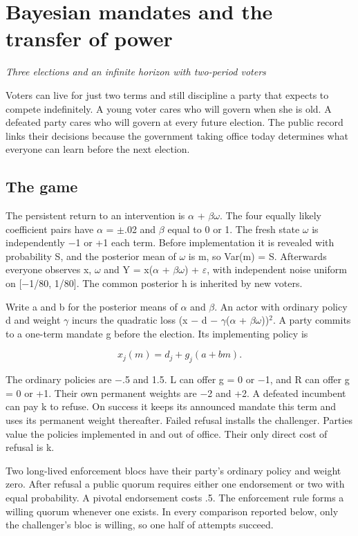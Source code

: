 \documentclass[11pt]{article}
\begin{document}
\section*{Bayesian mandates and the transfer of power}
\emph{Three elections and an infinite horizon with two-period voters}

Voters can live for just two terms and still discipline a party that expects to compete indefinitely. A young voter cares who will govern when she is old. A defeated party cares who will govern at every future election. The public record links their decisions because the government taking office today determines what everyone can learn before the next election.

\subsection*{The game}

The persistent return to an intervention is $\alpha$ + $\beta\omega$. The four equally likely coefficient pairs have $\alpha$ = $\pm$.02 and $\beta$ equal to 0 or 1. The fresh state $\omega$ is independently $-$1 or +1 each term. Before implementation it is revealed with probability S, and the posterior mean of $\omega$ is m, so Var(m) = S. Afterwards everyone observes x, $\omega$ and Y = x($\alpha$ + $\beta\omega$) + $\varepsilon$, with independent noise uniform on [$-$1/80, 1/80]. The common posterior h is inherited by new voters.

Write a and b for the posterior means of $\alpha$ and $\beta$. An actor with ordinary policy d and weight $\gamma$ incurs the quadratic loss (x $-$ d $-$ $\gamma$($\alpha$ + $\beta\omega$))${}^2$. A party commits to a one-term mandate g before the election. Its implementing policy is

\[x_j(m)=d_j+g_j(a+bm).\]

The ordinary policies are $-$.5 and 1.5. L can offer g = 0 or $-$1, and R can offer g = 0 or +1. Their own permanent weights are $-$2 and +2. A defeated incumbent can pay k to refuse. On success it keeps its announced mandate this term and uses its permanent weight thereafter. Failed refusal installs the challenger. Parties value the policies implemented in and out of office. Their only direct cost of refusal is k.

Two long-lived enforcement blocs have their party's ordinary policy and weight zero. After refusal a public quorum requires either one endorsement or two with equal probability. A pivotal endorsement costs .5. The enforcement rule forms a willing quorum whenever one exists. In every comparison reported below, only the challenger's bloc is willing, so one half of attempts succeed.
\end{document}
